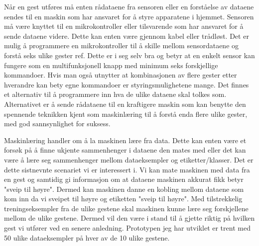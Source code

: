Når en gest utføres må enten rådataene fra sensoren eller en forståelse av dataene sendes til en maskin som har ansvaret for å styre apparatene i hjemmet. Sensoren må være knyttet til en mikrokontroller eller tilsvarende som har ansvaret for å sende dataene videre. Dette kan enten være gjennom kabel eller trådløst. Det er mulig å programmere en mikrokontroller til å skille mellom sensordataene og forstå seks ulike gester {\color{red} ref}. Dette er i seg selv bra og betyr at en enkelt sensor kan fungere som en multifunksjonell knapp med minimum seks forskjellige kommandoer. Hvis man også utnytter at kombinasjonen av flere gester etter hverandre kan bety egne kommandoer er styringsmulighetene mange. Det finnes et alternativ til å programmere inn hva de ulike dataene skal tolkes som. Alternativet er å sende rådataene til en kraftigere maskin som kan benytte den spennende teknikken kjent som maskinlæring til å forstå enda flere ulike gester, med god sannsynlighet for suksess.

Maskinlæring handler om å la maskinen lære fra data. Dette kan enten være et forsøk på å finne ukjente sammenhenger i dataene den mates med eller det kan være å lære seg sammenhenger mellom dataeksempler og etiketter/klasser. Det er dette sistnevnte scenariet vi er interessert i. Vi kan mate maskinen med data fra en gest og samtidig gi informasjon om at dataene maskinen akkurat fikk betyr "sveip til høyre". Dermed kan maskinen danne en kobling mellom dataene som kom inn da vi sveipet til høyre og etiketten "sveip til høyre". Med tilstrekkelig treningseksempler fra de ulike gestene skal maskinen kunne lære seg forskjellene mellom de ulike gestene. Dermed vil den være i stand til å gjette riktig på hvilken gest vi utfører ved en senere anledning. Prototypen jeg har utviklet er trent med 50 ulike dataeksempler på hver av de 10 ulike gestene.

